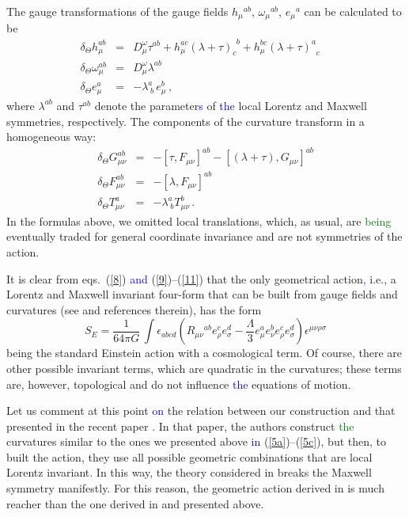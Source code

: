 \documentclass[prd,reprint,eqsecnum,nofootinbib]{revtex4-1}
\begin{document}
The gauge transformations of the gauge fields $h_\mu{}^{ab}$,
$\omega_\mu{}^{ab}$, $e_\mu{}^{a}$ can be calculated to be
\begin{eqnarray}
        \delta_\Theta h^{ab}_{\mu}&=&D^\omega_\mu \tau^{ab}+
h^{ac}_\mu(\lambda+\tau)_{c}^{\;\,b}+h^{bc}_\mu(\lambda+\tau)^{a}_{\;\;c}\label{6}\quad\\
      \delta_\Theta \omega^{ab}_{\mu}&=& D^\omega_\mu \lambda^{ab}
      \label{7}\\
   \delta_\Theta e^{a}_{\mu}&=&-\lambda^a_{\;b}
    \,e^b_\mu\,,\label{8}
\end{eqnarray}
where $\lambda^{ab}$ and $\tau^{ab}$ denote the parameter\textcolor{blue}{s} of \textcolor{blue}{the} local
Lorentz and Maxwell symmetries, respectively. The
components of the curvature transform in a homogeneous way\textcolor{blue}{:}
\begin{eqnarray}
        \delta_\Theta G^{ab}_{\mu\nu}&=&-[\tau,F_{\mu\nu}]^{ab}-[(\lambda+\tau),G_{\mu\nu}]^{ab}\label{9}\\
      \delta_\Theta F^{ab}_{\mu\nu}&=&-[\lambda,F_{\mu\nu}]^{ab}  \label{10}\\
    \delta_\Theta
    T^{a}_{\mu\nu}&=&-\lambda^a_{\;b}T^b_{\mu\nu}\,.\label{11}
\end{eqnarray}
In the formulas above\textcolor{blue}{,} we omitted local translations, which, as
usual, are \textcolor{green}{being} eventually traded for general coordinate invariance
and are not symmetries of the action.

It is clear from eqs.\ (\ref{8})\textcolor{blue}{ and } (\ref{9})--(\ref{11}) that the
only geometrical action\textcolor{blue}{,} i.e., a Lorentz and Maxwell invariant
four-form that can be built from gauge fields and curvatures (see
\cite{Durka:2011nf} and references therein)\textcolor{blue}{,} has the form
\begin{equation}
S_{E} =\frac1{64\pi G}\,
\int\epsilon_{abcd}\left(R_{\mu\nu}{}^{ab}e_{\rho}^{c}e_{\sigma}^{d}
-\frac{\Lambda}{3}e_{\mu}^{a}e_{\nu}^{b}e_{\rho}^{ c}e_{\sigma}^{
d}\right)\epsilon^{\mu\nu\rho\sigma}\label{12}
\end{equation}
being the standard Einstein action with a cosmological term. Of
course, there are other possible invariant terms, which are
quadratic in the curvatures; these terms are\textcolor{blue}{,} however\textcolor{blue}{,} topological
and do not influence \textcolor{blue}{the} equations of motion.

Let us comment at this point \textcolor{blue}{on} the relation between our construction
and that presented in the recent paper \cite{deAzcarraga:2010sw}. In
that paper\textcolor{blue}{,} the authors construct \textcolor{green}{the} curvatures similar to the ones
we presented above \textcolor{blue}{in} (\ref{5a})--(\ref{5c}), but then, to built the
action, they use all possible geometric combinations that are local
Lorentz invariant. In this way\textcolor{blue}{,} the theory considered in
\cite{deAzcarraga:2010sw}
breaks the Maxwell symmetry manifestly.
For this reason\textcolor{blue}{,} the geometric action derived in
\cite{deAzcarraga:2010sw} is much reacher than the one derived in
\cite{Durka:2011nf} and presented above.
\end{document}
